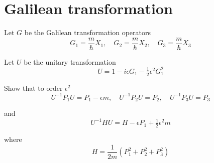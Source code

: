 

\section*{Galilean transformation}

Let $G$ be the Galilean transformation operators
\begin{equation*}
G_1=\frac{m}{\hbar}X_1,\quad G_2=\frac{m}{\hbar}X_2,\quad G_3=\frac{m}{\hbar}X_3
\end{equation*}

Let $U$ be the unitary transformation
\begin{equation*}
U=1-i\epsilon G_1-\tfrac{1}{2}\epsilon^2G_1^2
\end{equation*}

Show that to order $\epsilon^2$
\begin{equation*}
U^{-1}P_1U=P_1-\epsilon m,\quad U^{-1}P_2U=P_2,\quad U^{-1}P_3U=P_3\tag{1}
\end{equation*}

and
\begin{equation*}
U^{-1}HU=H-\epsilon P_1+\tfrac{1}{2}\epsilon^2m\tag{2}
\end{equation*}

where
\begin{equation*}
H=\frac{1}{2m}\left(P_1^2+P_2^2+P_3^2\right)
\end{equation*}


